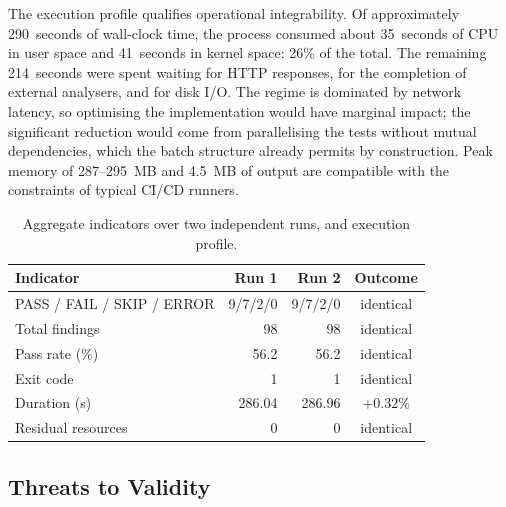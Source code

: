 \documentclass[
]{ceurart}
\begin{document}
The execution profile qualifies operational integrability.
Of approximately 290~seconds of wall-clock time, the process consumed about 35~seconds of CPU in user space and 41~seconds in kernel space: 26\% of the total.
The remaining 214~seconds were spent waiting for HTTP responses, for the completion of external analysers, and for disk I/O.
The regime is dominated by network latency, so optimising the implementation would have marginal impact; the significant reduction would come from parallelising the tests without mutual dependencies, which the batch structure already permits by construction.
Peak memory of 287--295~MB and 4.5~MB of output are compatible with the constraints of typical CI/CD runners.

\begin{table}
  \caption{Aggregate indicators over two independent runs, and execution profile.}
  \label{tab:kpi}
  \begin{tabular}{lrrc}
    \toprule
    \textbf{Indicator}         & \textbf{Run 1} & \textbf{Run 2} & \textbf{Outcome} \\
    \midrule
    PASS / FAIL / SKIP / ERROR & 9/7/2/0        & 9/7/2/0        & identical        \\
    Total findings             & 98             & 98             & identical        \\
    Pass rate (\%)             & 56.2           & 56.2           & identical        \\
    Exit code                  & 1              & 1              & identical        \\
    Duration (s)               & 286.04         & 286.96         & $+0.32\%$        \\
    Residual resources         & 0              & 0              & identical        \\
    \bottomrule
  \end{tabular}
\end{table}

\subsection{Threats to Validity}
\label{sec:threats}
\end{document}
